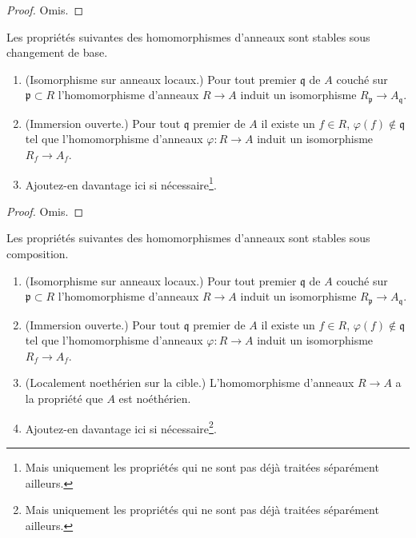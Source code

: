 \begin{proof}
Omis.
\end{proof}

\begin{lemma}
\label{lemma-properties-base-change}
Les propriétés suivantes des homomorphismes d'anneaux sont stables sous changement de base.
\begin{enumerate}
\item (Isomorphisme sur anneaux locaux.)
Pour tout premier $\mathfrak q$ de $A$ couché sur $\mathfrak p \subset R$
l'homomorphisme d'anneaux $R \to A$
induit un isomorphisme $R_{\mathfrak p} \to A_{\mathfrak q}$.
\item (Immersion ouverte.)
Pour tout $\mathfrak q$ premier de $A$ il existe un
$f \in R$, $\varphi(f) \not \in \mathfrak q$ tel que l'homomorphisme d'anneaux $\varphi : R \to A$ induit
un isomorphisme $R_f \to A_f$.
\item Ajoutez-en davantage ici si nécessaire\footnote{Mais uniquement les propriétés
qui ne sont pas déjà traitées séparément ailleurs.}.
\end{enumerate}
\end{lemma}

\begin{proof}
Omis.
\end{proof}

\begin{lemma}
\label{lemma-properties-composition}
Les propriétés suivantes des homomorphismes d'anneaux sont stables sous composition.
\begin{enumerate}
\item (Isomorphisme sur anneaux locaux.)
Pour tout premier $\mathfrak q$ de $A$ couché sur $\mathfrak p \subset R$
l'homomorphisme d'anneaux $R \to A$
induit un isomorphisme $R_{\mathfrak p} \to A_{\mathfrak q}$.
\item (Immersion ouverte.)
Pour tout $\mathfrak q$ premier de $A$ il existe un
$f \in R$, $\varphi(f) \not \in \mathfrak q$ tel que l'homomorphisme d'anneaux $\varphi : R \to A$ induit
un isomorphisme $R_f \to A_f$.
\item (Localement noethérien sur la cible.) L'homomorphisme
d'anneaux $R \to A$ a la propriété que $A$ est noéthérien.
\item Ajoutez-en davantage ici si nécessaire\footnote{Mais uniquement les propriétés
qui ne sont pas déjà traitées séparément ailleurs.}.
\end{enumerate}
\end{lemma}

